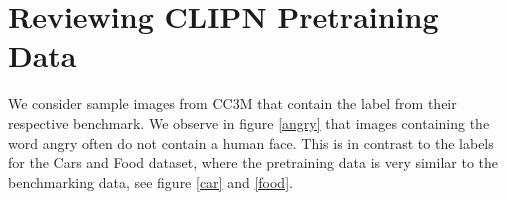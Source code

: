 \documentclass{article} %
\theoremstyle{plain}
\theoremstyle{definition}
\theoremstyle{remark}
\begin{document}



\section{Reviewing CLIPN Pretraining Data}

We consider sample images from CC3M that contain the label from their respective benchmark. We observe in figure \ref{angry} that images containing the word angry often do not contain a human face. This is in contrast to the labels for the Cars and Food dataset, where the pretraining data is very similar to the benchmarking data, see figure \ref{car} and \ref{food}.
\end{document}
